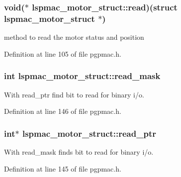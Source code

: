 \hypertarget{structlspmac__motor__struct_ac62692eb939c04ca35e939d1c3acfe8f}{
\subsubsection[{read}]{\setlength{\rightskip}{0pt plus 5cm}void($\ast$ lspmac\-\_\-motor\-\_\-struct\-::read)(struct {\bf lspmac\-\_\-motor\-\_\-struct} $\ast$)}}\label{structlspmac__motor__struct_ac62692eb939c04ca35e939d1c3acfe8f}


method to read the motor status and position 



Definition at line 105 of file pgpmac.\-h.

\hypertarget{structlspmac__motor__struct_a3c24ed30c5a3ad490c6139b2780b2af7}{
\subsubsection[{read\-\_\-mask}]{\setlength{\rightskip}{0pt plus 5cm}int lspmac\-\_\-motor\-\_\-struct\-::read\-\_\-mask}}\label{structlspmac__motor__struct_a3c24ed30c5a3ad490c6139b2780b2af7}


With read\-\_\-ptr find bit to read for binary i/o. 



Definition at line 146 of file pgpmac.\-h.

\hypertarget{structlspmac__motor__struct_a844b28ccabab5048ca216db074fb9704}{
\subsubsection[{read\-\_\-ptr}]{\setlength{\rightskip}{0pt plus 5cm}int$\ast$ lspmac\-\_\-motor\-\_\-struct\-::read\-\_\-ptr}}\label{structlspmac__motor__struct_a844b28ccabab5048ca216db074fb9704}


With read\-\_\-mask finds bit to read for binary i/o. 



Definition at line 145 of file pgpmac.\-h.

